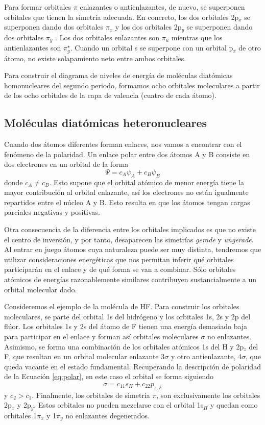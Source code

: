 \documentclass{tufte-handout}
\begin{document}
Para formar orbitales $\pi$ enlazantes o antienlazantes, 
de nuevo, se superponen orbitales que tienen la simetría
adecuada. En concreto, los dos orbitales 2p$_x$ se 
superponen dando dos orbitales $\pi_x$ y los dos orbitales 
2p$_y$ se superponen dando dos orbitales $\pi_y$ . Los dos
orbitales enlazantes son $\pi_u$ mientras que los
antienlazantes son $\pi_g^\star$.
Cuando un orbital s se superpone con un orbital p$_x$ de otro átomo, no existe solapamiento neto entre ambos orbitales.

Para construir el diagrama de niveles de energía de moléculas diatómicas homonucleares del segundo periodo, formamos ocho 
orbitales moleculares a partir de los ocho orbitales de la 
capa de valencia (cuatro de cada átomo).

\subsection{Moléculas diatómicas heteronucleares}
Cuando dos átomos diferentes forman enlaces, nos vamos
a encontrar con el fenómeno de la polaridad. 
Un enlace polar entre dos átomos A y B consiste en dos 
electrones en un orbital de la forma
\begin{equation}
    \Psi=c_A\psi_A + c_B\psi_B\label{eq:polar}
\end{equation}
donde $c_A\neq c_B$. Esto supone que el orbital atómico
de menor energía tiene la mayor contribución al orbital 
enlazante, así los electrones no están igualmente repartidos
entre el núcleo A y B. Esto resulta en que los átomos 
tengan cargas parciales negativas y positivas.

Otra consecuencia de la diferencia entre los orbitales 
implicados es que no existe el centro de inversión, y 
por tanto, desaparecen las simetrías \textit{gerade} y 
\textit{ungerade}. Al entrar en juego átomos 
cuya naturaleza puede ser muy distinta, tendremos que 
utilizar consideraciones energéticas que nos permitan 
inferir qué orbitales participarán en el enlace y de qué 
forma se van a combinar. Sólo orbitales atómicos de 
energías razonablemente similares contribuyen sustancialmente
a un orbital molecular dado.

Consideremos el ejemplo de la molécula de HF. Para construir 
los orbitales moleculares, se parte del orbital 1s del hidrógeno
y los orbitales 1s, 2s y 2p del flúor. Los orbitales 1s y 2s
del átomo de F tienen una energía demasiado baja para participar
en el enlace y forman así orbitales moleculares $\sigma$
no enlazantes. Asimismo, se forma una combinación de los 
orbitales atómicos 1s del H y 2p$_z$ del F, que resultan en
un orbital molecular enlazante 3$\sigma$ y otro antienlazante, 
4$\sigma$, que queda vacante en el estado fundamental. 
Recuperando la descripción de polaridad de la Ecuación
\ref{eq:polar}, en este caso el orbital se forma siguiendo
\begin{equation}
    \sigma=c_11s_H + c_22p_{z,F}
\end{equation}
y $c_2>c_1$. Finalmente, los orbitales de simetría $\pi$, 
son exclusivamente los orbitales 2p$_x$ y 2p$_y$. Estos 
orbitales no pueden mezclarse con el orbital 1s$_H$ y
quedan como orbitales 1$\pi_x$ y 1$\pi_y$ no enlazantes degenerados. 
\end{document}
